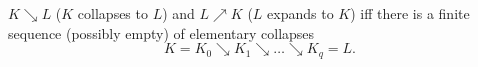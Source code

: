 $K \searrow L$ ($K$ collapses to $L$) and $L \nearrow K$ ($L$ expands to $K$) iff there is a finite sequence (possibly empty) of elementary collapses
$$K = K_0 \searrow K_1 \searrow \dots \searrow K_q = L.$$

